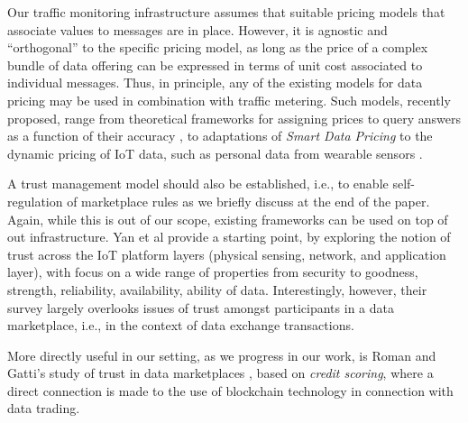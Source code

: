 \documentclass[chi_draft]{sigchi}
\begin{document}


%

Our traffic monitoring infrastructure assumes that suitable pricing models that associate values to messages are in place.
However, it is agnostic and ``orthogonal'' to the specific pricing model, as long as the price of a complex bundle of data offering can be expressed in terms of unit cost associated to individual messages. 
Thus, in principle, any of the existing models for data pricing may be used in combination with traffic metering. Such models, recently proposed, range from theoretical frameworks for assigning prices to query answers as a function of their accuracy \cite{Li:2014:TPP:2691190.2691191}, to adaptations of \textit{Smart Data Pricing} \cite{Sen:2015:SDP:2847579.2756543} to the dynamic pricing of IoT data, such as personal data from wearable sensors \cite{7437020}.

A trust management model should also be established, i.e., to enable self-regulation of marketplace rules as we briefly discuss at the end of the paper.
Again, while this is out of our scope, existing frameworks can be used on top of out infrastructure.
Yan et al \cite{Yan2014a} provide a starting point, by exploring the notion of trust across the IoT platform layers (physical sensing, network, and application layer), with focus on  a wide range of properties from security to goodness, strength, reliability, availability, ability of data. Interestingly, however, their survey largely overlooks issues of trust amongst participants in a data marketplace, i.e., in the context of data exchange transactions.

More directly useful in our setting, as we progress in our work, is Roman and Gatti's study of trust in data marketplaces \cite{7573695}, based on \textit{credit scoring}, where a direct connection is made to the use of blockchain technology in connection with data trading.
\end{document}
